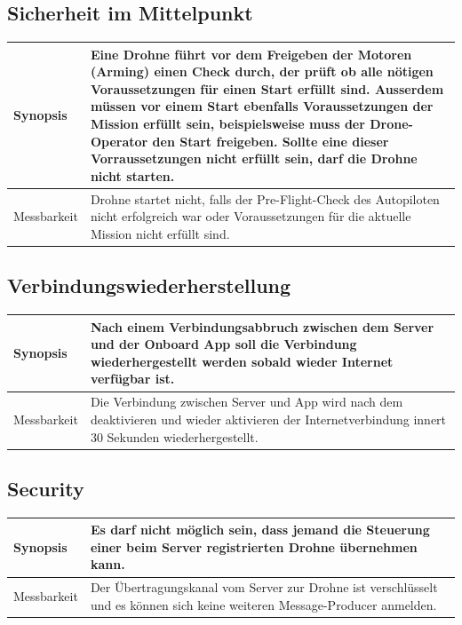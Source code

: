 \subsection{Sicherheit im Mittelpunkt}
\begin{tabular}{|p{}|p{}|} \hline
	Synopsis & Eine Drohne führt vor dem Freigeben der Motoren (Arming) einen Check durch, der prüft ob alle nötigen Voraussetzungen für einen Start erfüllt sind. Ausserdem müssen vor einem Start ebenfalls Voraussetzungen der Mission erfüllt sein, beispielsweise muss der Drone-Operator den Start freigeben. Sollte eine dieser Vorraussetzungen nicht erfüllt sein, darf die Drohne nicht starten.  \\ \hline
	
	Messbarkeit & Drohne startet nicht, falls der Pre-Flight-Check des Autopiloten nicht erfolgreich war oder Voraussetzungen für die aktuelle Mission nicht erfüllt sind. \\ \hline
\end{tabular}
\subsection{Verbindungswiederherstellung}
\begin{tabular}{|p{}|p{}|} \hline
	Synopsis & Nach einem Verbindungsabbruch zwischen dem Server und der Onboard App soll die Verbindung wiederhergestellt werden sobald wieder Internet verfügbar ist. \\ \hline
	
	Messbarkeit & Die Verbindung zwischen Server und App wird nach dem deaktivieren und wieder aktivieren der Internetverbindung innert 30 Sekunden wiederhergestellt.\\ \hline
\end{tabular}

\subsection{Security}
\begin{tabular}{|p{}|p{}|} \hline
	Synopsis & Es darf nicht möglich sein, dass jemand die Steuerung einer beim Server registrierten Drohne übernehmen kann.\\ \hline
	Messbarkeit & Der Übertragungskanal vom Server zur Drohne ist verschlüsselt und es können sich keine weiteren \Gls{Message-Producer} anmelden.\\ \hline
\end{tabular}
